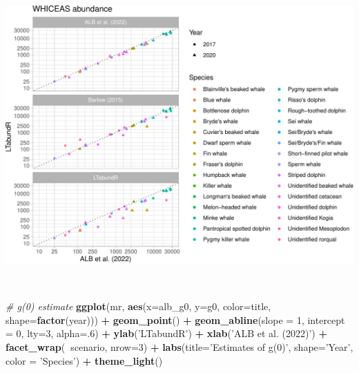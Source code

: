 \documentclass[
]{book}
\newenvironment{Shaded}{\begin{snugshade}}{\end{snugshade}}
\newcommand{\CommentTok}[1]{\textcolor[rgb]{0.56,0.35,0.01}{\textit{#1}}}
\newcommand{\DataTypeTok}[1]{\textcolor[rgb]{0.13,0.29,0.53}{#1}}
\newcommand{\DecValTok}[1]{\textcolor[rgb]{0.00,0.00,0.81}{#1}}
\newcommand{\KeywordTok}[1]{\textcolor[rgb]{0.13,0.29,0.53}{\textbf{#1}}}
\newcommand{\NormalTok}[1]{#1}
\newcommand{\OperatorTok}[1]{\textcolor[rgb]{0.81,0.36,0.00}{\textbf{#1}}}
\newcommand{\StringTok}[1]{\textcolor[rgb]{0.31,0.60,0.02}{#1}}
\begin{document}
\includegraphics{figures/unnamed-chunk-385-1.pdf}

~

\begin{Shaded}
\begin{Highlighting}[]
\CommentTok{# g(0) estimate}
\KeywordTok{ggplot}\NormalTok{(mr,}
       \KeywordTok{aes}\NormalTok{(}\DataTypeTok{x=}\NormalTok{alb_g0, }\DataTypeTok{y=}\NormalTok{g0, }
           \DataTypeTok{color=}\NormalTok{title, }\DataTypeTok{shape=}\KeywordTok{factor}\NormalTok{(year))) }\OperatorTok{+}
\StringTok{    }\KeywordTok{geom_point}\NormalTok{() }\OperatorTok{+}
\StringTok{    }\KeywordTok{geom_abline}\NormalTok{(}\DataTypeTok{slope =} \DecValTok{1}\NormalTok{, }\DataTypeTok{intercept =} \DecValTok{0}\NormalTok{, }\DataTypeTok{lty=}\DecValTok{3}\NormalTok{, }\DataTypeTok{alpha=}\NormalTok{.}\DecValTok{6}\NormalTok{) }\OperatorTok{+}
\StringTok{    }\KeywordTok{ylab}\NormalTok{(}\StringTok{'LTabundR'}\NormalTok{) }\OperatorTok{+}\StringTok{ }\KeywordTok{xlab}\NormalTok{(}\StringTok{'ALB et al. (2022)'}\NormalTok{) }\OperatorTok{+}
\StringTok{  }\KeywordTok{facet_wrap}\NormalTok{(}\OperatorTok{~}\NormalTok{scenario, }\DataTypeTok{nrow=}\DecValTok{3}\NormalTok{) }\OperatorTok{+}\StringTok{ }
\StringTok{  }\KeywordTok{labs}\NormalTok{(}\DataTypeTok{title=}\StringTok{'Estimates of g(0)'}\NormalTok{, }
       \DataTypeTok{shape=}\StringTok{'Year'}\NormalTok{, }\DataTypeTok{color =} \StringTok{'Species'}\NormalTok{) }\OperatorTok{+}\StringTok{ }
\StringTok{  }\KeywordTok{theme_light}\NormalTok{()}
\end{Highlighting}
\end{Shaded}
\end{document}
